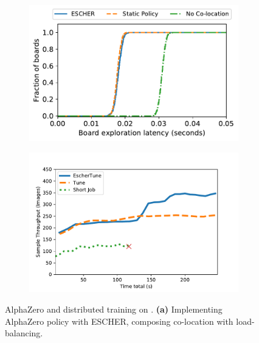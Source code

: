 \begin{figure}[t]
\begin{subfigure}[b]{0.26\textwidth}
  \centering
  \includegraphics[width=\textwidth]{escher/plots/results_e2e_alphago_latencycdf_16node.pdf}
  \caption{}
  \label{fig:alphazerolatencycdf}
\end{subfigure}
\begin{subfigure}[b]{0.26\textwidth}
\centering
\includegraphics[width=\textwidth,trim=0cm 0cm 1.5cm 0cm, clip]{escher/plots/result_migrationthroughput.pdf}
\caption{}
\label{fig:tune-results}
\end{subfigure}
\caption{\small AlphaZero and distributed training on \name{}. \textbf{(a)} Implementing AlphaZero policy with ESCHER, composing co-location with load-balancing.
}
\end{figure}

